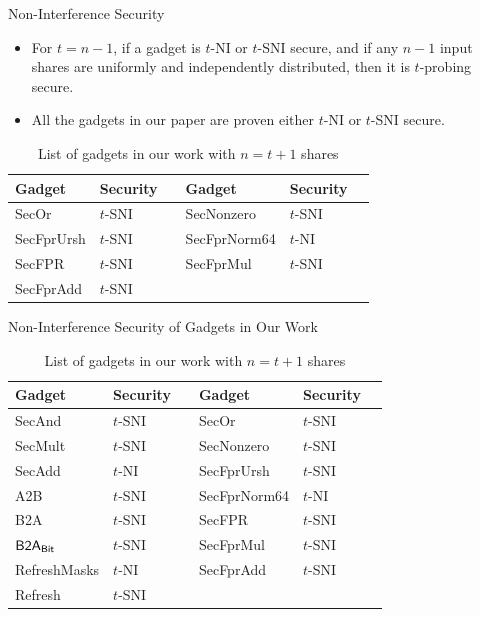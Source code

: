 \begin{frame}{Non-Interference Security}

\begin{itemize}

\item For $t = n-1$, if a gadget is $t$-NI or $t$-SNI secure, and if any $n-1$ input shares are uniformly and independently distributed, then it is $t$-probing secure.
\pause

\item All the gadgets in our paper are proven either $t$-NI or $t$-SNI secure.

\end{itemize}


\begin{table}
\centering
\begin{tabular}{l l l l} 
\toprule
\textbf{Gadget} & \textbf{Security$\quad$} & \textbf{Gadget} & \textbf{Security$\quad$} \\
\midrule
{\sf SecOr} & $t$-SNI & {\sf SecNonzero} & $t$-SNI \\
{\sf SecFprUrsh} & $t$-SNI & {\sf SecFprNorm64} & $t$-NI \\
{\sf SecFPR} & $t$-SNI & {\sf SecFprMul} & $t$-SNI \\
{\sf SecFprAdd} & $t$-SNI & &\\
\bottomrule
\end{tabular}
\caption{List of gadgets in our work with $n=t+1$ shares}
\label{table:gadgets_secureity}
\end{table}


\end{frame}


%
%
%
\iffalse

\begin{frame}{Non-Interference Security of Gadgets in Our Work}

\begin{table}
\centering
\begin{tabular}{l l | l l} 
\toprule
\textbf{Gadget} & \textbf{Security$\quad$} & \textbf{Gadget} & \textbf{Security$\quad$} \\
\midrule
{\sf SecAnd} & $t$-SNI & {\sf SecOr} & $t$-SNI \\
{\sf SecMult} & $t$-SNI & {\sf SecNonzero} & $t$-SNI \\
{\sf SecAdd} & $t$-NI & {\sf SecFprUrsh} & $t$-SNI \\
{\sf A2B} & $t$-SNI & {\sf SecFprNorm64} & $t$-NI\\
{\sf B2A} & $t$-SNI & {\sf SecFPR} & $t$-SNI \\
${\sf B2A_{Bit}}$ & $t$-SNI & {\sf SecFprMul} & $t$-SNI\\
{\sf RefreshMasks} & $t$-NI & {\sf SecFprAdd} & $t$-SNI\\
{\sf Refresh} & $t$-SNI \\
\bottomrule
\end{tabular}
\caption{List of gadgets in our work with $n=t+1$ shares}
\label{table:gadgets_secureity}
\end{table}
\end{frame}

